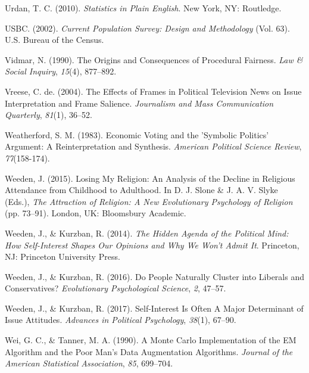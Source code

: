 \documentclass[12pt,econ]{sources/authesis}
\begin{document}
\leavevmode\hypertarget{ref-urdan_statistics_2010}{}%
Urdan, T. C. (2010). \emph{Statistics in Plain English}. New York, NY: Routledge.

\leavevmode\hypertarget{ref-census_2002_current}{}%
USBC. (2002). \emph{Current Population Survey: Design and Methodology} (Vol. 63). U.S. Bureau of the Census.

\leavevmode\hypertarget{ref-vidmar_1990_origins}{}%
Vidmar, N. (1990). The Origins and Consequences of Procedural Fairness. \emph{Law \& Social Inquiry}, \emph{15}(4), 877--892.

\leavevmode\hypertarget{ref-vreese_effects_2004}{}%
Vreese, C. de. (2004). The Effects of Frames in Political Television News on Issue Interpretation and Frame Salience. \emph{Journalism and Mass Communication Quarterly}, \emph{81}(1), 36--52.

\leavevmode\hypertarget{ref-weatherford_economic_1983}{}%
Weatherford, S. M. (1983). Economic Voting and the 'Symbolic Politics' Argument: A Reinterpretation and Synthesis. \emph{American Political Science Review}, \emph{77}(158-174).

\leavevmode\hypertarget{ref-weeden_2015_losing}{}%
Weeden, J. (2015). Losing My Religion: An Analysis of the Decline in Religious Attendance from Childhood to Adulthood. In D. J. Slone \& J. A. V. Slyke (Eds.), \emph{The Attraction of Religion: A New Evolutionary Psychology of Religion} (pp. 73--91). London, UK: Bloomsbury Academic.

\leavevmode\hypertarget{ref-weeden_2014_hidden}{}%
Weeden, J., \& Kurzban, R. (2014). \emph{The Hidden Agenda of the Political Mind: How Self-Interest Shapes Our Opinions and Why We Won't Admit It}. Princeton, NJ: Princeton University Press.

\leavevmode\hypertarget{ref-weeden_2016_people}{}%
Weeden, J., \& Kurzban, R. (2016). Do People Naturally Cluster into Liberals and Conservatives? \emph{Evolutionary Psychological Science}, \emph{2}, 47--57.

\leavevmode\hypertarget{ref-weeden_2017_self-interest}{}%
Weeden, J., \& Kurzban, R. (2017). Self-Interest Is Often A Major Determinant of Issue Attitudes. \emph{Advances in Political Psychology}, \emph{38}(1), 67--90.

\leavevmode\hypertarget{ref-wei_1990_monte}{}%
Wei, G. C., \& Tanner, M. A. (1990). A Monte Carlo Implementation of the EM Algorithm and the Poor Man's Data Augmentation Algorithms. \emph{Journal of the American Statistical Association}, \emph{85}, 699--704.
\end{document}
